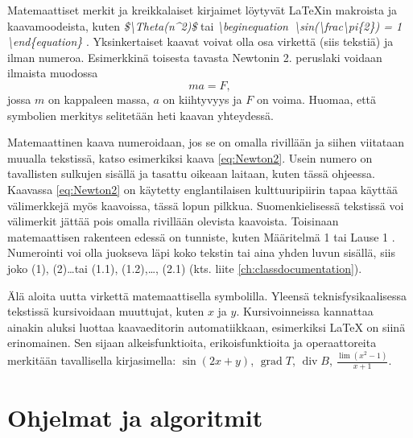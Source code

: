\documentclass[globalnumbering,centeredcaptions]{tutthesis/tutthesis} %
\begin{document}
Matemaattiset merkit ja kreikkalaiset kirjaimet löytyvät LaTeXin makroista ja kaavamoodeista, kuten
\emph{\$\textbackslash Theta(n\textasciicircum2)\$}
tai
\emph{\textbackslash begin\textbraceleft equation\textbraceright\ \textbackslash sin(\textbackslash frac\textbraceleft \textbackslash pi\textbraceright\{2\}) = 1 \textbackslash end\{equation\}}
.
Yksinkertaiset kaavat voivat olla osa virkettä (siis tekstiä) ja ilman numeroa.
Esimerkkinä toisesta tavasta Newtonin 2. peruslaki voidaan ilmaista muodossa
\begin{equation} %
\label{eq:Newton2} ma = F,
\end{equation} %
jossa $m$ on kappaleen massa, $a$ on kiihtyvyys ja $F$ on voima.
Huomaa, että symbolien merkitys selitetään heti kaavan yhteydessä.


Matemaattinen kaava numeroidaan, jos se on omalla rivillään ja siihen viitataan muualla tekstissä, katso esimerkiksi kaava \eqref{eq:Newton2}.
Usein numero on tavallisten sulkujen sisällä ja tasattu oikeaan laitaan, kuten tässä ohjeessa.
Kaavassa \eqref{eq:Newton2} on käytetty englantilaisen kulttuuripiirin tapaa käyttää välimerkkejä myös kaavoissa, tässä lopun pilkkua.
Suomenkielisessä tekstissä voi välimerkit jättää pois omalla rivillään olevista kaavoista.
Toisinaan matemaattisen rakenteen edessä on tunniste, kuten Määritelmä 1 tai Lause 1 \citep{Ruohonen2009}.
Numerointi voi olla juokseva läpi koko tekstin tai aina yhden luvun sisällä, siis joko (1), (2)\ldots tai (1.1), (1.2),\ldots, (2.1) (kts. liite \ref{ch:classdocumentation}).

Älä aloita uutta virkettä matemaattisella symbolilla.
Yleensä teknisfysikaalisessa tekstissä kursivoidaan muuttujat, kuten $x$ ja $y$.
Kursivoinneissa kannattaa ainakin aluksi luottaa kaavaeditorin automatiikkaan, esimerkiksi LaTeX \citep{Oetiker2011} on siinä erinomainen.
Sen sijaan alkeisfunktioita, erikoisfunktioita ja operaattoreita merkitään tavallisella kirjasimella: $\sin (2x+y)$, $\operatorname{grad} T$, $\operatorname{div} B$, $\frac{\lim (x^2 - 1)}{x + 1}$.


\section{Ohjelmat ja algoritmit}
\end{document}
